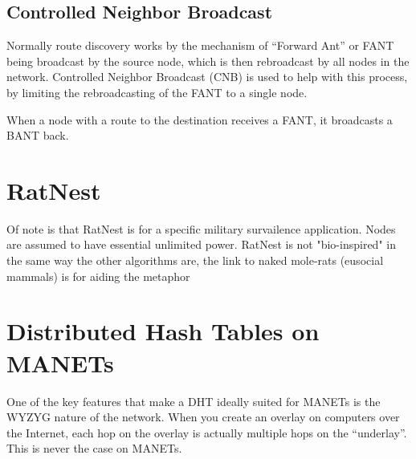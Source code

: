 \documentclass[a4paper]{article}
\begin{document}
\subsection{Controlled Neighbor Broadcast}
Normally route discovery works by the mechanism of ``Forward Ant'' or FANT being broadcast by the source node, which is then rebroadcast by all nodes in the network.  Controlled Neighbor Broadcast (CNB) is used to help with this process, by limiting the rebroadcasting of the FANT to a single node.

When a node with a route to the destination receives a FANT, it broadcasts a BANT back.

\section{RatNest}

Of note is that RatNest is for a specific military survailence application.  Nodes are assumed to have essential unlimited power.
RatNest is not "bio-inspired" in the same way the other algorithms are, the link to naked mole-rats (eusocial mammals) is for aiding the metaphor

\section{Distributed Hash Tables on MANETs}
One of the key features that make a DHT ideally suited for MANETs is the WYZYG nature of the network.  When you create an overlay on computers over the Internet, each hop on the overlay is actually multiple hops on the ``underlay''.  This is never the case on MANETs.







\end{document}

